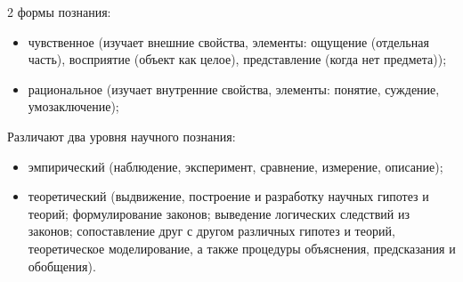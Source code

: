 2 формы познания:

\begin{itemize}
	\item чувственное (изучает внешние свойства, элементы: ощущение (отдельная часть), восприятие (объект как целое), представление (когда нет предмета));
	\item рациональное (изучает внутренние свойства, элементы: понятие, суждение, умозаключение);
\end{itemize}

Различают два уровня научного познания:
\begin{itemize}
	\item эмпирический (наблюдение, эксперимент, сравнение, измерение, описание);
	\item теоретический (выдвижение, построение и разработку научных гипотез и теорий; формулирование законов; выведение логических следствий из законов; сопоставление друг с другом различных гипотез и теорий, теоретическое моделирование, а также процедуры объяснения, предсказания и обобщения).
\end{itemize}